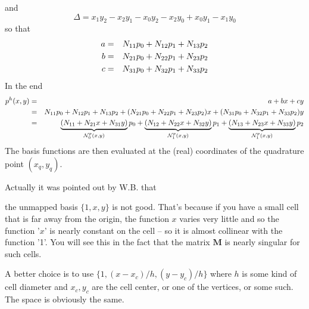 and
\[
\Delta = x_1y_2-x_2y_1 - x_0y_2-x_2y_0 + x_0y_1-x_1y_0
\]
so that
\begin{eqnarray}
a &=& N_{11}p_0 + N_{12} p_1 + N_{13} p_2 \nonumber\\
b &=& N_{21}p_0 + N_{22} p_1 + N_{23} p_2 \nonumber\\
c &=& N_{31}p_0 + N_{32} p_1 + N_{33} p_2 \nonumber
\end{eqnarray}
In the end 
\begin{eqnarray}
p^h(x,y) 
&=&  a+bx+cy \nonumber\\
&=& N_{11}p_0 + N_{12} p_1 + N_{13} p_2
+ ( N_{21}p_0 + N_{22} p_1 + N_{23} p_2) x
+ ( N_{31}p_0 + N_{32} p_1 + N_{33} p_2) y \nonumber\\
&=& \underbrace{(N_{11} + N_{21}x + N_{31}y)}_{{\mathcal{N}}_0^p(x,y)} p_0 
+   \underbrace{(N_{12} + N_{22}x + N_{32}y)}_{{\mathcal{N}}_1^p(x,y)} p_1 
+   \underbrace{(N_{13} + N_{23}x + N_{33}y)}_{{\mathcal{N}}_1^p(x,y)} p_2
\end{eqnarray}
The basis functions are then evaluated at the (real) coordinates 
of the quadrature point $(x_q,y_q)$.


Actually it was pointed out by W.B. that 
{\color{darkgray} the unmapped basis $\{1,x,y\}$ is not good. That's because if you have a
small cell that is far away from the origin, the function $x$ varies very
little and so the function '$x$' is nearly constant on the cell -- so it is
almost collinear with the function '1'. You will see this in the fact
that the matrix ${\bm M}$ is nearly singular for such cells. 

A better choice is to use  $\{1, (x-x_c)/h, (y-y_c)/h \}$
where $h$ is some kind of cell diameter and $x_c,y_c$ are the cell center, 
or one of the vertices, or some such. The space is obviously the same.}

